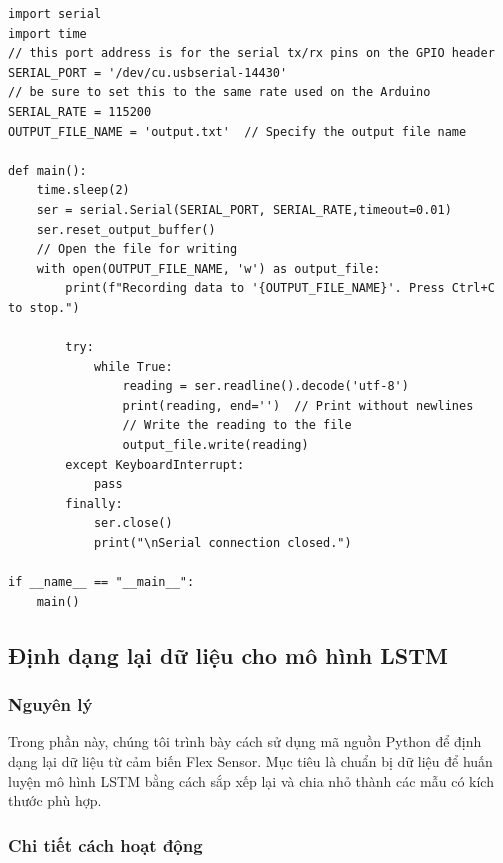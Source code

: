 \begin{lstlisting}
import serial
import time
// this port address is for the serial tx/rx pins on the GPIO header
SERIAL_PORT = '/dev/cu.usbserial-14430'
// be sure to set this to the same rate used on the Arduino
SERIAL_RATE = 115200
OUTPUT_FILE_NAME = 'output.txt'  // Specify the output file name

def main():
    time.sleep(2)
    ser = serial.Serial(SERIAL_PORT, SERIAL_RATE,timeout=0.01)
    ser.reset_output_buffer()
    // Open the file for writing
    with open(OUTPUT_FILE_NAME, 'w') as output_file:
        print(f"Recording data to '{OUTPUT_FILE_NAME}'. Press Ctrl+C to stop.")
        
        try:
            while True:
                reading = ser.readline().decode('utf-8')
                print(reading, end='')  // Print without newlines
                // Write the reading to the file
                output_file.write(reading)
        except KeyboardInterrupt:
            pass
        finally:
            ser.close()
            print("\nSerial connection closed.")

if __name__ == "__main__":
    main()
\end{lstlisting}

\subsection{Định dạng lại dữ liệu cho mô hình LSTM}

\subsubsection{Nguyên lý}

\indent Trong phần này, chúng tôi trình bày cách sử dụng mã nguồn Python để định dạng lại dữ liệu từ cảm biến Flex Sensor. Mục tiêu là chuẩn bị dữ liệu để huấn luyện mô hình LSTM bằng cách sắp xếp lại và chia nhỏ thành các mẫu có kích thước phù hợp.

\subsubsection{Chi tiết cách hoạt động}


